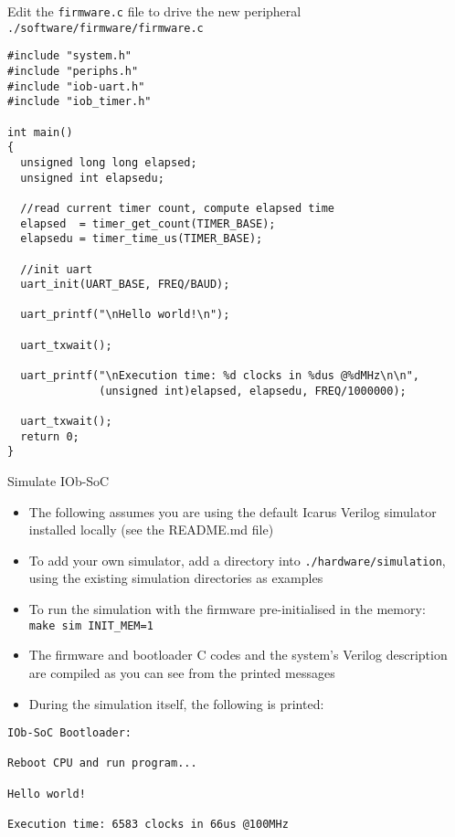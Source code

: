\documentclass [xcolor=svgnames, t] {beamer}
\begin{document}
\begin{frame}[fragile]{Edit the {\tt firmware.c} file to drive the new peripheral}
  {\tt ./software/firmware/firmware.c}
  \begin{tiny}
    \begin{lstlisting}
#include "system.h"
#include "periphs.h"
#include "iob-uart.h"
#include "iob_timer.h"

int main()
{
  unsigned long long elapsed;
  unsigned int elapsedu;

  //read current timer count, compute elapsed time
  elapsed  = timer_get_count(TIMER_BASE);
  elapsedu = timer_time_us(TIMER_BASE);

  //init uart 
  uart_init(UART_BASE, FREQ/BAUD);

  uart_printf("\nHello world!\n");
  
  uart_txwait();

  uart_printf("\nExecution time: %d clocks in %dus @%dMHz\n\n", 
              (unsigned int)elapsed, elapsedu, FREQ/1000000);

  uart_txwait();
  return 0;
}
\end{lstlisting}
\end{tiny}
\end{frame}


\begin{frame}[fragile]{Simulate IOb-SoC}
\begin{itemize}
\item The following assumes you are using the default Icarus Verilog simulator
  installed locally (see the README.md file)
\item To add your own simulator, add a directory into {\tt ./hardware/simulation}, using the existing simulation directories as examples
\item To run the simulation with the firmware pre-initialised in the memory:\\
  {\tt make sim INIT\_MEM=1}
\item The firmware and bootloader C codes and the system's Verilog description are compiled as you can see from the printed messages
\item During the simulation itself, the following is printed:
\end{itemize}

\begin{tiny}
  \begin{lstlisting}
IOb-SoC Bootloader:

Reboot CPU and run program...

Hello world!

Execution time: 6583 clocks in 66us @100MHz

  \end{lstlisting}
\end{tiny}
\end{frame}
\end{document}
